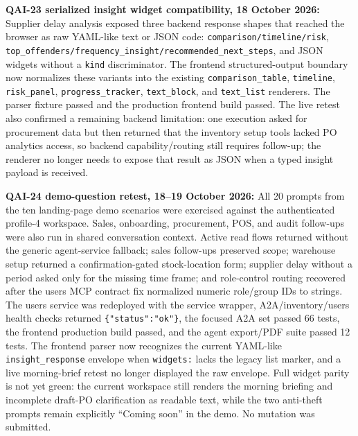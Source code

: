 \documentclass[10pt]{article}
\begin{document}
\colorbox{mist}{\parbox{0.96\textwidth}{\textbf{QAI-23 serialized insight widget compatibility, 18 October 2026:} Supplier delay analysis exposed three backend response shapes that reached the browser as raw YAML-like text or JSON code: \texttt{comparison/timeline/risk}, \texttt{top\_offenders/frequency\_insight/recommended\_next\_steps}, and JSON widgets without a \texttt{kind} discriminator. The frontend structured-output boundary now normalizes these variants into the existing \texttt{comparison\_table}, \texttt{timeline}, \texttt{risk\_panel}, \texttt{progress\_tracker}, \texttt{text\_block}, and \texttt{text\_list} renderers. The parser fixture passed and the production frontend build passed. The live retest also confirmed a remaining backend limitation: one execution asked for procurement data but then returned that the inventory setup tools lacked PO analytics access, so backend capability/routing still requires follow-up; the renderer no longer needs to expose that result as JSON when a typed insight payload is received.}}

\colorbox{mist}{\parbox{0.96\textwidth}{\textbf{QAI-24 demo-question retest, 18--19 October 2026:} All 20 prompts from the ten landing-page demo scenarios were exercised against the authenticated profile-4 workspace. Sales, onboarding, procurement, POS, and audit follow-ups were also run in shared conversation context. Active read flows returned without the generic agent-service fallback; sales follow-ups preserved scope; warehouse setup returned a confirmation-gated stock-location form; supplier delay without a period asked only for the missing time frame; and role-control routing recovered after the users MCP contract fix normalized numeric role/group IDs to strings. The users service was redeployed with the service wrapper, A2A/inventory/users health checks returned \texttt{\{"status":"ok"\}}, the focused A2A set passed 66 tests, the frontend production build passed, and the agent export/PDF suite passed 12 tests. The frontend parser now recognizes the current YAML-like \texttt{insight\_response} envelope when \texttt{widgets:} lacks the legacy list marker, and a live morning-brief retest no longer displayed the raw envelope. Full widget parity is not yet green: the current workspace still renders the morning briefing and incomplete draft-PO clarification as readable text, while the two anti-theft prompts remain explicitly ``Coming soon'' in the demo. No mutation was submitted.}}
\end{document}
